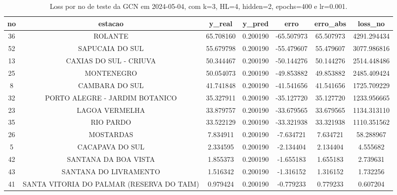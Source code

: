 \begin{table}[h]
\centering
\caption{Loss por no de teste da GCN em 2024-05-04, com k=3, HL=4, hidden=2, epochs=400 e lr=0.001.}
\label{tab:gcn_loss_k3_hl4_h2_e400_d20240504}
\begin{tabular}{ccccccc}
\toprule
no & estacao & y\_real & y\_pred & erro & erro\_abs & loss\_no \\
\midrule
36 & ROLANTE & 65.708160 & 0.200190 & -65.507973 & 65.507973 & 4291.294434 \\
52 & SAPUCAIA DO SUL & 55.679798 & 0.200190 & -55.479607 & 55.479607 & 3077.986816 \\
13 & CAXIAS DO SUL - CRIUVA & 50.344467 & 0.200190 & -50.144276 & 50.144276 & 2514.448486 \\
25 & MONTENEGRO & 50.054073 & 0.200190 & -49.853882 & 49.853882 & 2485.409424 \\
8 & CAMBARA DO SUL & 41.741848 & 0.200190 & -41.541656 & 41.541656 & 1725.709229 \\
32 & PORTO ALEGRE - JARDIM BOTANICO & 35.327911 & 0.200190 & -35.127720 & 35.127720 & 1233.956665 \\
23 & LAGOA VERMELHA & 33.879757 & 0.200190 & -33.679565 & 33.679565 & 1134.313110 \\
35 & RIO PARDO & 33.522129 & 0.200190 & -33.321938 & 33.321938 & 1110.351562 \\
26 & MOSTARDAS & 7.834911 & 0.200190 & -7.634721 & 7.634721 & 58.288967 \\
5 & CACAPAVA DO SUL & 2.334595 & 0.200190 & -2.134404 & 2.134404 & 4.555682 \\
42 & SANTANA DA BOA VISTA & 1.855373 & 0.200190 & -1.655183 & 1.655183 & 2.739631 \\
43 & SANTANA DO LIVRAMENTO & 1.516342 & 0.200190 & -1.316152 & 1.316152 & 1.732256 \\
41 & SANTA VITORIA DO PALMAR (RESERVA DO TAIM) & 0.979424 & 0.200190 & -0.779233 & 0.779233 & 0.607204 \\
\bottomrule
\end{tabular}
\end{table}
